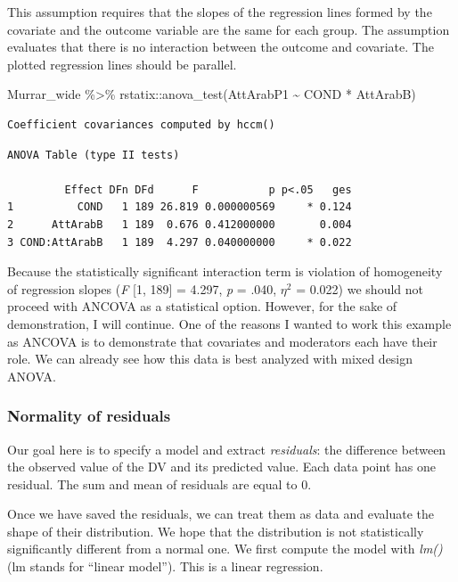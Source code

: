\documentclass[
  11pt,
]{book}
\newenvironment{Shaded}{\begin{snugshade}}{\end{snugshade}}
\newcommand{\FunctionTok}[1]{\textcolor[rgb]{0.00,0.00,0.00}{#1}}
\newcommand{\NormalTok}[1]{#1}
\newcommand{\SpecialCharTok}[1]{\textcolor[rgb]{0.00,0.00,0.00}{#1}}
\begin{document}
This assumption requires that the slopes of the regression lines formed by the covariate and the outcome variable are the same for each group. The assumption evaluates that there is no interaction between the outcome and covariate. The plotted regression lines should be parallel.

\begin{Shaded}
\begin{Highlighting}[]
\NormalTok{Murrar\_wide }\SpecialCharTok{\%\textgreater{}\%}
\NormalTok{    rstatix}\SpecialCharTok{::}\FunctionTok{anova\_test}\NormalTok{(AttArabP1 }\SpecialCharTok{\textasciitilde{}}\NormalTok{ COND }\SpecialCharTok{*}\NormalTok{ AttArabB)}
\end{Highlighting}
\end{Shaded}

\begin{verbatim}
Coefficient covariances computed by hccm()
\end{verbatim}

\begin{verbatim}
ANOVA Table (type II tests)

         Effect DFn DFd      F           p p<.05   ges
1          COND   1 189 26.819 0.000000569     * 0.124
2      AttArabB   1 189  0.676 0.412000000       0.004
3 COND:AttArabB   1 189  4.297 0.040000000     * 0.022
\end{verbatim}

Because the statistically significant interaction term is violation of homogeneity of regression slopes (\emph{F} {[}1, 189{]} = 4.297, \emph{p} = .040, \(\eta^2\) = 0.022) we should not proceed with ANCOVA as a statistical option. However, for the sake of demonstration, I will continue. One of the reasons I wanted to work this example as ANCOVA is to demonstrate that covariates and moderators each have their role. We can already see how this data is best analyzed with mixed design ANOVA.

\hypertarget{normality-of-residuals}{%
\subsubsection{Normality of residuals}\label{normality-of-residuals}}

Our goal here is to specify a model and extract \emph{residuals}: the difference between the observed value of the DV and its predicted value. Each data point has one residual. The sum and mean of residuals are equal to 0.

Once we have saved the residuals, we can treat them as data and evaluate the shape of their distribution. We hope that the distribution is not statistically significantly different from a normal one. We first compute the model with \emph{lm()} (lm stands for ``linear model''). This is a linear regression.
\end{document}
